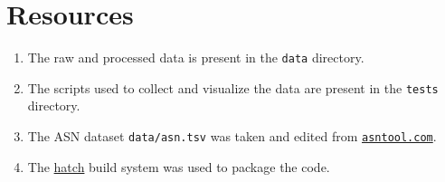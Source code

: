 \documentclass[journal,12pt,twocolumn]{IEEEtran}
\begin{document}
\section{Resources}

\begin{enumerate}
     \item The raw and processed data is present in the \texttt{data} directory.
     \item The scripts used to collect and visualize the data are present in the
     \texttt{tests} directory.
     \item The ASN dataset \texttt{data/asn.tsv} was taken and edited from
     \href{https://asntool.com/}{\texttt{asntool.com}}.
     \item The \href{https://hatch.pypa.io/latest/}{hatch} build system was used
     to package the code.
\end{enumerate}
\end{document}
